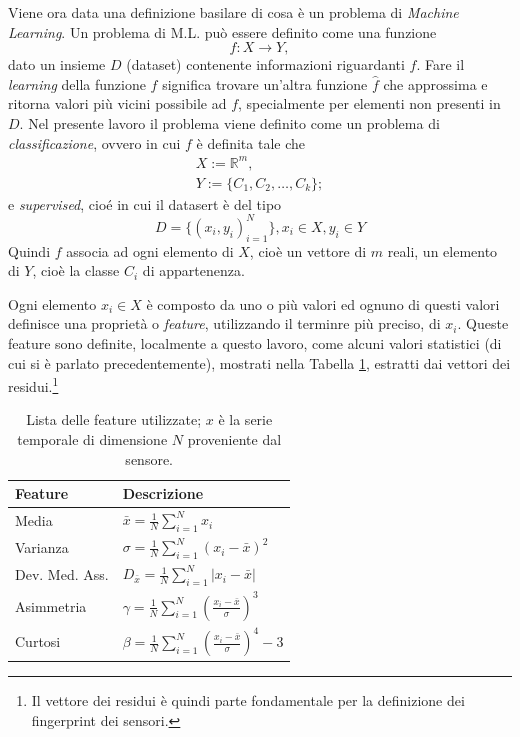 \documentclass[Lau,binding=0.6cm]{sapthesis}
\begin{document}
Viene ora data una definizione basilare di cosa \`e un problema di \textit{Machine Learning}.
Un problema di M.L. pu\`o essere definito come una funzione 
\begin{equation}
f: X \to Y,\label{eq:3}
\end{equation}
dato un insieme $D$ (dataset) contenente informazioni riguardanti $f$.
Fare il \textit{learning} della funzione $f$ significa trovare un'altra funzione $\hat{f}$ che approssima e ritorna valori più vicini possibile ad $f$, specialmente per elementi non presenti in $D$.
Nel presente lavoro il problema viene definito come un problema di \textit{classificazione}, ovvero in cui $f$ \`e definita tale che
\begin{equation}
    \begin{array}{l}
    X := \mathbb{R}^m, \\
    Y := \{ C_1, C_2, \ldots, C_k \};
    \end{array}
\end{equation} 
e \textit{supervised}, cio\'e in cui il datasert \`e del tipo
\begin{equation}
    D = \{ (x_i, y_i)_{i=1}^N \}, x_i\in X, y_i\in Y
\end{equation}
Quindi $f$ associa ad ogni elemento di $X$, cio\`e un vettore di $m$ reali, un elemento di $Y$, cio\`e la classe $C_i$ di appartenenza.

Ogni elemento $x_i \in X$ \`e composto da uno o pi\`u valori ed ognuno di questi valori definisce una propriet\`a o \textit{feature}, utilizzando il terminre pi\`u preciso, di $x_i$. 
Queste feature sono definite, localmente a questo lavoro, come alcuni valori statistici (di cui si \`e parlato precedentemente), mostrati nella Tabella \ref{tab:1}, estratti dai vettori dei residui.\footnote{Il vettore dei residui \`e quindi parte fondamentale per la definizione dei fingerprint dei sensori.}

\begin{table}[tb]
    \begin{center}
        \begin{tabular}{|l|l|}
        \hline
        \textbf{Feature} & \textbf{Descrizione} \\
        \hline
        Media & $\bar{x} = \frac{1}{N}\sum_{i=1}^N x_i$ \\
        \hline
        Varianza & $\sigma = \frac{1}{N}\sum_{i=1}^N (x_i - \bar{x})^2 $ \\
        \hline
        Dev. Med. Ass. & $D_{\bar{x}} = \frac{1}{N}\sum_{i=1}^N |x_i - \bar{x}|$ \\
        \hline
        Asimmetria & $\gamma = \frac{1}{N} \sum_{i=1}^N (\frac{x_i - \bar{x}}{\sigma})^3 $ \\
        \hline
        Curtosi & $ \beta = \frac{1}{N} \sum_{i=1}^N (\frac{x_i - \bar{x}}{\sigma})^4 - 3$\\
        \hline
        \end{tabular}
    \end{center}
    \caption{Lista delle feature utilizzate; $x$ \`e la serie temporale di dimensione $N$ proveniente dal sensore.}
    \label{tab:1}
\end{table}
\end{document}

